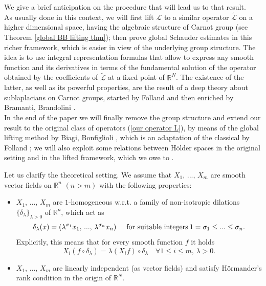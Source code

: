 \documentclass{article}
\numberwithin{equation}{section}
\begin{document}
\vspace{2mm}

We give a brief anticipation on the procedure that will lead us to that result.\\As usually done in this context, we will first lift $\mathcal{L}$ to a similar operator $\mathcal{\widetilde{L}}$ on a higher dimensional space, having the algebraic structure of Carnot group (see Theorem \ref{global BB lifting thm}); then prove global Schauder estimates in this richer framework, which is easier in view of the underlying group structure.
The idea is to use integral representation formulas that allow to express any smooth function and its derivatives in terms of the fundamental solution of the  operator obtained by  the coefficients of $\mathcal{\widetilde{L}}$ at a fixed point of $\mathbb{R}^N$. The existence of the latter, as well as its powerful properties, are the result of a deep theory about sublaplacians on Carnot groups, started by Folland \cite{Fo2} and then enriched by Bramanti, Brandolini \cite{librone}.\\
In the end of the paper we will finally remove the group structure and extend our result to the original class of operators (\ref{our operator L}), by means of the global lifting method by Biagi, Bonfiglioli \cite{lifting BB}, which is an adaptation of the classical by Folland \cite{Fo1}; we will also exploit some relations between Hölder spaces in the original setting and in the lifted framework, which we owe to \cite{Hölder spaces: original vs lifted}.

\vspace{2mm}

\hspace{-7mm} Let us clarify the theoretical setting. We assume that $X_1, \, ..., \, X_m$ are smooth vector fields on $\mathbb{R}^n$ $(n>m)$ with the following properties:
\begin{itemize}
    \item [(H1)] $X_1, \, ...,\, X_m$ are $1$-homogeneous w.r.t. a family of non-isotropic dilations $\{\delta_{\lambda}\}_{\lambda>0}$ of $\mathbb{R}^n$, which act as
    \begin{equation*}
        \delta_{\lambda}(x) = (\lambda^{\sigma_1} x_1, \, ..., \, \lambda^{\sigma_n} x_n) \hspace{5mm} \text{for suitable integers} \: 1 = \sigma_1 \leq ... \leq \sigma_n.
    \end{equation*}
    Explicitly, this means that for every smooth function $f$ it holds
    \begin{equation*}
        X_i (f \circ \delta_{\lambda}) = \lambda (X_i f) \circ \delta_{\lambda} \quad \forall 1 \leq i \leq m, \, \lambda>0.
    \end{equation*}
    \item [(H2)] $X_1, \, ..., \, X_m$ are linearly independent (as vector fields) and satisfy Hörmander's rank condition in the origin of $\mathbb{R}^N$.
\end{itemize}
\end{document}
